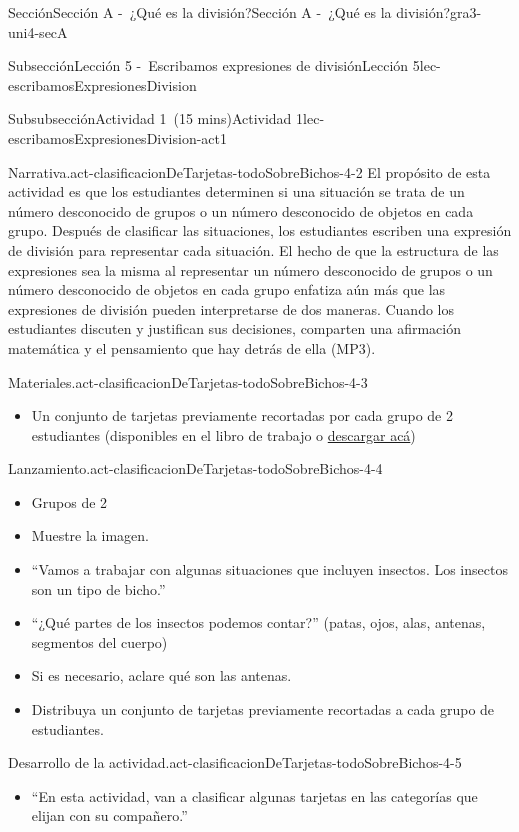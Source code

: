 \documentclass[oneside,10pt,]{article}
\begin{document}
\begin{sectionptx}{Sección}{Sección A -~¿Qué es la división?}{}{Sección A -~¿Qué es la división?}{}{}{gra3-uni4-secA}
\begin{subsectionptx}{Subsección}{Lección 5 -~Escribamos expresiones de división}{}{Lección 5}{}{}{lec-escribamosExpresionesDivision}
\begin{subsubsectionptx}{Subsubsección}{Actividad 1~(15 mins)}{}{Actividad 1}{}{}{lec-escribamosExpresionesDivision-act1}
\begin{paragraphs}{Narrativa.}{act-clasificacionDeTarjetas-todoSobreBichos-4-2}
El propósito de esta actividad es que los estudiantes determinen si una situación se trata de un número desconocido de grupos o un número desconocido de objetos en cada grupo. Después de clasificar las situaciones, los estudiantes escriben una expresión de división para representar cada situación. El hecho de que la estructura de las expresiones sea la misma al representar un número desconocido de grupos o un número desconocido de objetos en cada grupo enfatiza aún más que las expresiones de división pueden interpretarse de dos maneras. Cuando los estudiantes discuten y justifican sus decisiones, comparten una afirmación matemática y el pensamiento que hay detrás de ella (MP3).%
\end{paragraphs}%
\begin{paragraphs}{Materiales.}{act-clasificacionDeTarjetas-todoSobreBichos-4-3}%
%
\begin{itemize}[label=\textbullet]
\item{}Un conjunto de tarjetas previamente recortadas por cada grupo de 2 estudiantes (disponibles en el libro de trabajo o \href{external/act-pdf/act-clasificacionDeTarjetas-todoSobreBichos.pdf}{descargar acá}\footnotemark{})%
\end{itemize}
\end{paragraphs}%
\begin{paragraphs}{Lanzamiento.}{act-clasificacionDeTarjetas-todoSobreBichos-4-4}%
%
\begin{itemize}[label=\textbullet]
\item{}Grupos de 2%
\item{}Muestre la imagen.%
\item{}``Vamos a trabajar con algunas situaciones que incluyen insectos. Los insectos son un tipo de bicho.''%
\item{}``¿Qué partes de los insectos podemos contar?'' (patas, ojos, alas, antenas, segmentos del cuerpo)%
\item{}Si es necesario, aclare qué son las antenas.%
\item{}Distribuya un conjunto de tarjetas previamente recortadas a cada grupo de estudiantes.%
\end{itemize}
\end{paragraphs}%
\begin{paragraphs}{Desarrollo de la actividad.}{act-clasificacionDeTarjetas-todoSobreBichos-4-5}%
%
\begin{itemize}[label=\textbullet]
\item{}``En esta actividad, van a clasificar algunas tarjetas en las categorías que elijan con su compañero.''%

\end{itemize}
\end{paragraphs}
\end{subsubsectionptx}
\end{subsectionptx}
\end{sectionptx}
\end{document}
